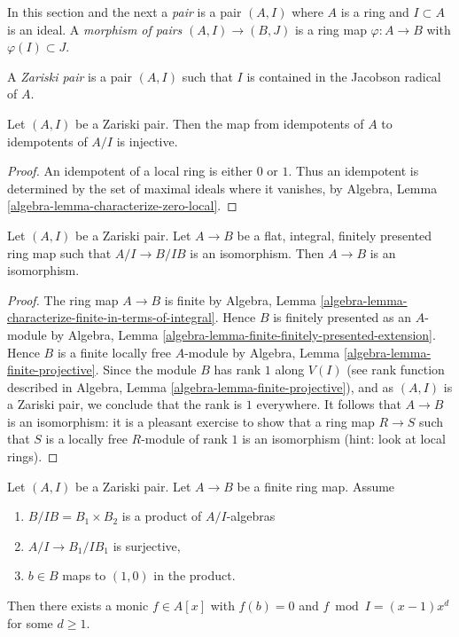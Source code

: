 \noindent
In this section and the next a {\it pair} is a pair $(A, I)$ where $A$
is a ring and $I \subset A$ is an ideal. A {\it morphism of pairs}
$(A, I) \to (B, J)$ is a ring map $\varphi : A \to B$ with
$\varphi(I) \subset J$.

\begin{definition}
\label{definition-zariski-pair}
A {\it Zariski pair} is a pair $(A, I)$ such that
$I$ is contained in the Jacobson radical of $A$.
\end{definition}

\begin{lemma}
\label{lemma-idempotents-determined-modulo-radical}
Let $(A, I)$ be a Zariski pair. Then the map from
idempotents of $A$ to idempotents of $A/I$ is injective.
\end{lemma}

\begin{proof}
An idempotent of a local ring is either $0$ or $1$.
Thus an idempotent is determined by the set of maximal ideals
where it vanishes, by
Algebra, Lemma \ref{algebra-lemma-characterize-zero-local}.
\end{proof}

\begin{lemma}
\label{lemma-check-isomorphism-zariski}
Let $(A, I)$ be a Zariski pair. Let $A \to B$ be a flat,
integral, finitely presented ring map such that $A/I \to B/IB$
is an isomorphism. Then $A \to B$ is an isomorphism.
\end{lemma}

\begin{proof}
The ring map $A \to B$ is finite by
Algebra, Lemma \ref{algebra-lemma-characterize-finite-in-terms-of-integral}.
Hence $B$ is finitely presented as an $A$-module by
Algebra, Lemma \ref{algebra-lemma-finite-finitely-presented-extension}.
Hence $B$ is a finite locally free $A$-module by
Algebra, Lemma \ref{algebra-lemma-finite-projective}.
Since the module $B$ has rank $1$
along $V(I)$ (see rank function described in
Algebra, Lemma \ref{algebra-lemma-finite-projective}),
and as $(A, I)$ is a Zariski pair, we conclude that the
rank is $1$ everywhere.
It follows that $A \to B$ is an isomorphism:
it is a pleasant exercise to show that
a ring map $R \to S$ such that $S$ is a locally free $R$-module
of rank $1$ is an isomorphism (hint: look at local rings).
\end{proof}

\begin{lemma}
\label{lemma-helper-finite}
Let $(A, I)$ be a Zariski pair. Let $A \to B$ be a finite ring map.
Assume
\begin{enumerate}
\item $B/IB = B_1 \times B_2$ is a product of $A/I$-algebras
\item $A/I \to B_1/IB_1$ is surjective,
\item $b \in B$ maps to $(1, 0)$ in the product.
\end{enumerate}
Then there exists a monic $f \in A[x]$ with $f(b) = 0$ and
$f \bmod I = (x - 1)x^d$ for some $d \geq 1$.
\end{lemma}


